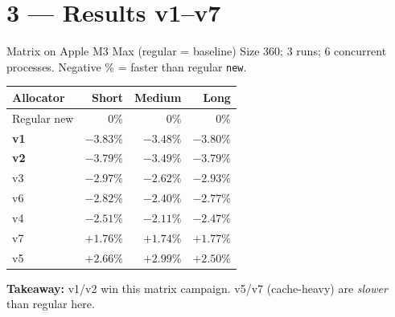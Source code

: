 \section{3 --- Results v1--v7}

\begin{frame}{Matrix on Apple M3 Max (regular = baseline)}
    {\footnotesize Size 360; 3 runs; 6 concurrent processes.
    Negative \% = faster than regular \texttt{new}.}

    \vspace{0.4em}
    \begin{center}
    {\scriptsize
    \begin{tabular}{@{}lrrr@{}}
        \toprule
        Allocator & Short & Medium & Long \\
        \midrule
        Regular new & 0\% & 0\% & 0\% \\
        \textbf{v1} & \(\mathbf{-3.83\%}\) & \(-3.48\%\) & \(\mathbf{-3.80\%}\) \\
        \textbf{v2} & \(-3.79\%\) & \(\mathbf{-3.49\%}\) & \(-3.79\%\) \\
        v3 & \(-2.97\%\) & \(-2.62\%\) & \(-2.93\%\) \\
        v6 & \(-2.82\%\) & \(-2.40\%\) & \(-2.77\%\) \\
        v4 & \(-2.51\%\) & \(-2.11\%\) & \(-2.47\%\) \\
        v7 & \(+1.76\%\) & \(+1.74\%\) & \(+1.77\%\) \\
        v5 & \(+2.66\%\) & \(+2.99\%\) & \(+2.50\%\) \\
        \bottomrule
    \end{tabular}
    }
    \end{center}

    \vspace{0.5em}
    \textbf{Takeaway:} v1/v2 win this matrix campaign.
    v5/v7 (cache-heavy) are \emph{slower} than regular here.
\end{frame}

